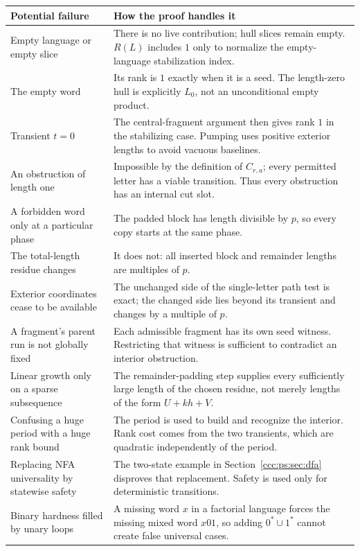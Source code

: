 \documentclass[11pt,letterpaper]{article}
\theoremstyle{definition}
\theoremstyle{remark}
\begin{document}
\begin{longtable}{@{}L{.28\textwidth}L{.66\textwidth}@{}}
\toprule
Potential failure & How the proof handles it\\
\midrule
\endhead
Empty language or empty slice & There is no live contribution; hull slices remain empty. $R(L)$ includes $1$ only to normalize the empty-language stabilization index.\\[4pt]
The empty word & Its rank is $1$ exactly when it is a seed. The length-zero hull is explicitly $L_0$, not an unconditional empty product.\\[4pt]
Transient $t=0$ & The central-fragment argument then gives rank $1$ in the stabilizing case. Pumping uses positive exterior lengths to avoid vacuous baselines.\\[4pt]
An obstruction of length one & Impossible by the definition of $C_{r,a}$; every permitted letter has a viable transition. Thus every obstruction has an internal cut slot.\\[4pt]
A forbidden word only at a particular phase & The padded block has length divisible by $p$, so every copy starts at the same phase.\\[4pt]
The total-length residue changes & It does not: all inserted block and remainder lengths are multiples of $p$.\\[4pt]
Exterior coordinates cease to be available & The unchanged side of the single-letter path test is exact; the changed side lies beyond its transient and changes by a multiple of $p$.\\[4pt]
A fragment's parent run is not globally fixed & Each admissible fragment has its own seed witness. Restricting that witness is sufficient to contradict an interior obstruction.\\[4pt]
Linear growth only on a sparse subsequence & The remainder-padding step supplies every sufficiently large length of the chosen residue, not merely lengths of the form $U+kh+V$.\\[4pt]
Confusing a huge period with a huge rank bound & The period is used to build and recognize the interior. Rank cost comes from the two transients, which are quadratic independently of the period.\\[4pt]
Replacing NFA universality by statewise safety & The two-state example in Section~\ref{ccc:ps:sec:dfa} disproves that replacement. Safety is used only for deterministic transitions.\\[4pt]
Binary hardness filled by unary loops & A missing word $x$ in a factorial language forces the missing mixed word $x01$, so adding $0^*\cup1^*$ cannot create false universal cases.\\[4pt]

\end{longtable}
\end{document}
